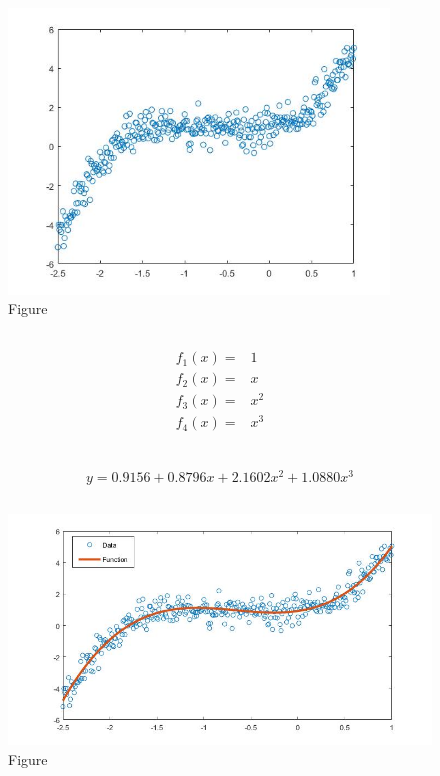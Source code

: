 \documentclass{article}
\begin{document}
        \subsection{}
            \begin{figure}[H] 
                \centering 
                \includegraphics[width=0.9\textwidth]{img/Assignement_4_4_1.jpg}
                \caption{Figure} 
            \end{figure}
        \subsection{}
            \begin{equation*}
                \begin{split}
                    f_1(x)=&1\\
                    f_2(x)=&x\\
                    f_3(x)=&x^2\\
                    f_4(x)=&x^3\\
                \end{split}
            \end{equation*}
        \subsection{}
            
            
            $$y=0.9156+0.8796x+2.1602x^2+1.0880x^3$$
        \subsection{}
            \begin{figure}[H] 
                \centering 
                \includegraphics[width=1\textwidth]{img/Assignement_4_4_2.jpg}
                \caption{Figure} 
            \end{figure}
\end{document}
